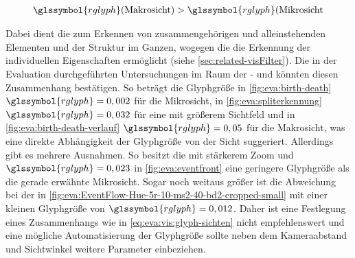 \begin{equation}
\begin{aligned}\label{eq:eva:vis:glyph-sichten}
\glssymbol{rglyph} (\text{Makrosicht}) > \glssymbol{rglyph}(\text{Mikrosicht}
\end{aligned}
\end{equation}

Dabei dient die  zum Erkennen von zusammengehörigen und alleinstehenden Elementen und der Struktur im Ganzen, wogegen die  die Erkennung der individuellen Eigenschaften ermöglicht (siehe \autoref{sec:related-visFilter}). Die in der Evaluation durchgeführten Untersuchungen im Raum der - und  könnten diesen Zusammenhang bestätigen. So beträgt die Glyphgröße in \autoref{fig:eva:birth-death} $\glssymbol{rglyph} = 0,002$ für die Mikrosicht, in \autoref{fig:eva:spliterkennung} $\glssymbol{rglyph} = 0,032$ für eine  mit größerem Sichtfeld und in \autoref{fig:eva:birth-death-verlauf} $\glssymbol{rglyph} = 0,05$ für die Makrosicht, was eine direkte Abhängigkeit der Glyphgröße  von der Sicht suggeriert. Allerdings gibt es mehrere Ausnahmen. So besitzt die  mit stärkerem Zoom und $\glssymbol{rglyph} = 0,023$ in \autoref{fig:eva:eventfront} eine geringere Glyphgröße als die gerade erwähnte Mikrosicht. Sogar noch weitaus größer ist die Abweichung bei der  in \autoref{fig:eva:EventFlow-Hue-5r-10-ms2-40-bd2-cropped-small} mit einer kleinen Glyphgröße von $\glssymbol{rglyph} = 0,012$. Daher ist eine Festlegung eines Zusammenhangs wie in \autoref{eq:eva:vis:glyph-sichten} nicht empfehlenswert und eine mögliche Automatisierung der Glyphgröße sollte neben dem Kameraabstand und Sichtwinkel weitere Parameter einbeziehen.



